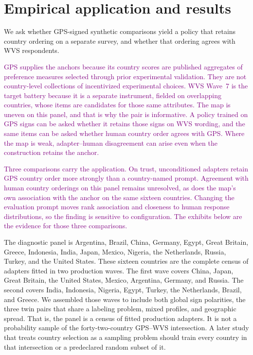 \section{Empirical application and results}\label{sec:results}
We ask whether GPS-signed synthetic comparisons yield a policy that retains country ordering on a separate survey, and whether that ordering agrees with WVS respondents.

\textcolor{purple}{GPS supplies the anchors because its country scores are published aggregates of preference measures selected through prior experimental validation. They are not country-level collections of incentivized experimental choices. WVS Wave~7 is the target battery because it is a separate instrument, fielded on overlapping countries, whose items are candidates for those same attributes. The map is uneven on this panel, and that is why the pair is informative. A policy trained on GPS signs can be asked whether it retains those signs on WVS wording, and the same items can be asked whether human country order agrees with GPS. Where the map is weak, adapter--human disagreement can arise even when the construction retains the anchor.}

\textcolor{purple}{Three comparisons carry the application. On trust, unconditioned adapters retain GPS country order more strongly than a country-named prompt. Agreement with human country orderings on this panel remains unresolved, as does the map's own association with the anchor on the same sixteen countries. Changing the evaluation prompt moves rank association and closeness to human response distributions, so the finding is sensitive to configuration. The exhibits below are the evidence for those three comparisons.}


The diagnostic panel is Argentina, Brazil, China, Germany, Egypt, Great Britain, Greece, Indonesia, India, Japan, Mexico, Nigeria, the Netherlands, Russia, Turkey, and the United States. These sixteen countries are the complete census of adapters fitted in two production waves. The first wave covers China, Japan, Great Britain, the United States, Mexico, Argentina, Germany, and Russia. The second covers India, Indonesia, Nigeria, Egypt, Turkey, the Netherlands, Brazil, and Greece. We assembled those waves to include both global sign polarities, the three twin pairs that share a labeling problem, mixed profiles, and geographic spread. That is, the panel is a census of fitted production adapters. It is not a probability sample of the forty-two-country GPS--WVS intersection. A later study that treats country selection as a sampling problem should train every country in that intersection or a predeclared random subset of it.

